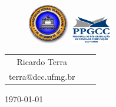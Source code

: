 {

\begin{figure}
     \includegraphics[width=1.8cm]{ufmg.png}
     \hspace{230pt}
     \includegraphics[width=1.8cm]{ppgcc.png}
\end{figure}


\begin{block}

\end{block}

\vspace{30pt}

\begin{table}[htdp]
\begin{center}
\begin{tabular}{cp{2cm}c}
Ricardo Terra\\
{\scriptsize terra@dcc.ufmg.br}
\end{tabular}
\end{center}
\end{table}%


\vspace{40pt}
\begin{beamercolorbox}[center,shadow=false]{}
\small \today
\end{beamercolorbox}

\vspace{40pt}
}

\begin{frame}
  \titlepage
\end{frame}